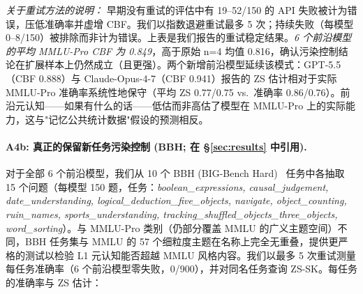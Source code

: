 \documentclass[11pt,a4paper,fontset=fandol]{ctexart}
\begin{document}
\emph{关于重试方法的说明：} 早期没有重试的评估中有 19--52/150 的 API 失败被计为错误，压低准确率并虚增 CBF。我们以指数退避重试最多 5 次；持续失败（每模型 0--8/150）被排除而非计为错误。上表是我们报告的重试稳定结果。\emph{6 个前沿模型的平均 MMLU-Pro CBF 为 0.849}，高于原始 n=4 均值 0.816，确认污染控制结论在扩展样本上仍然成立（且更强）。两个新增前沿模型延续该模式：GPT-5.5（CBF 0.888）与 Claude-Opus-4-7（CBF 0.941）报告的 ZS 估计相对于实际 MMLU-Pro 准确率系统性地保守（平均 ZS 0.77/0.75 vs.\ 准确率 0.86/0.76）。前沿元认知——如果有什么的话——低估而非高估了模型在 MMLU-Pro 上的实际能力，这与"记忆公共统计数据"假设的预测相反。

\paragraph{A4b: 真正的保留新任务污染控制 (BBH; 在 \S\ref{sec:results} 中引用).}
\label{app:heldout_bbh}
对于全部 6 个前沿模型，我们从 10 个 BBH (BIG-Bench Hard)~\citep{suzgun2022challenging} 任务中各抽取 15 个问题（每模型 150 题，任务：\emph{boolean\_expressions, causal\_judgement, date\_understanding, logical\_deduction\_five\_objects, navigate, object\_counting, ruin\_names, sports\_understanding, tracking\_shuffled\_objects\_three\_objects, word\_sorting}）。与 MMLU-Pro 类别（仍部分覆盖 MMLU 的广义主题空间）不同，BBH 任务集与 MMLU 的 57 个细粒度主题在名称上完全无重叠，提供更严格的测试以检验 L1 元认知能否超越 MMLU 风格内容。我们以最多 5 次重试测量每任务准确率（6 个前沿模型零失败，0/900），并对同名任务查询 ZS-SK。每任务的准确率与 ZS 估计：
\end{document}
